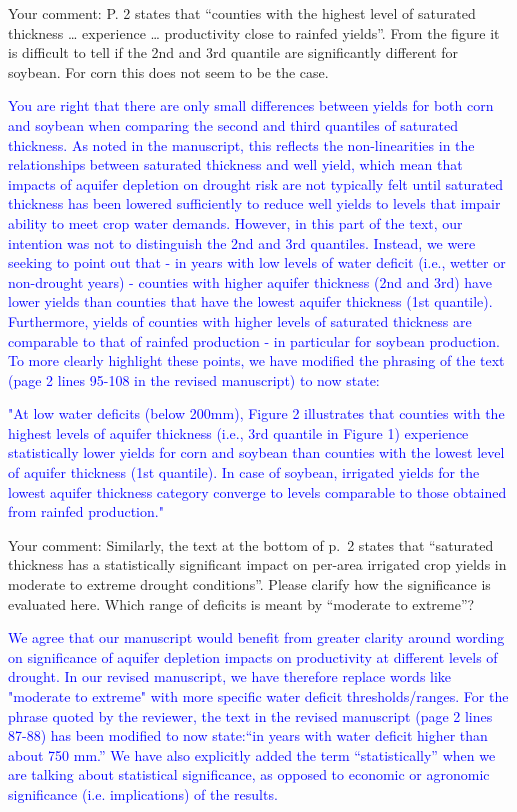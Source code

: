 \documentclass[
]{article}
\begin{document}
Your comment: P. 2 states that ``counties with the highest level of
saturated thickness \ldots{} experience \ldots{} productivity close to
rainfed yields''. From the figure it is difficult to tell if the 2nd and
3rd quantile are significantly different for soybean. For corn this does
not seem to be the case.

\textcolor{blue}{
You are right that there are only small differences between yields for both corn and soybean when comparing the second and third quantiles of saturated thickness. As noted in the manuscript, this reflects the non-linearities in the relationships between saturated thickness and well yield, which mean that impacts of aquifer depletion on drought risk are not typically felt until saturated thickness has been lowered sufficiently to reduce well yields to levels that impair ability to meet crop water demands. However, in this part of the text, our intention was not to distinguish the 2nd and 3rd quantiles. Instead, we were seeking to point out that - in years with low levels of water deficit (i.e., wetter or non-drought years) - counties with higher aquifer thickness (2nd and 3rd) have lower yields than counties that have the lowest aquifer thickness (1st quantile). Furthermore, yields of counties with higher levels of saturated thickness are comparable to that of rainfed production - in particular for soybean production. To more clearly highlight these points, we have modified the phrasing of the text (page 2 lines 95-108 in the revised manuscript) to now state:}

\textcolor{blue}{"At low water deficits (below 200mm), Figure 2 illustrates that counties with the highest levels of aquifer thickness (i.e., 3rd quantile in Figure 1) experience statistically lower yields for corn and soybean than counties with the lowest level of aquifer thickness (1st quantile). In case of soybean, irrigated yields for the lowest aquifer thickness category converge to levels comparable to those obtained from rainfed production."}

Your comment: Similarly, the text at the bottom of p.~2 states that
``saturated thickness has a statistically significant impact on per-area
irrigated crop yields in moderate to extreme drought conditions''.
Please clarify how the significance is evaluated here. Which range of
deficits is meant by ``moderate to extreme''?

\textcolor{blue}{We agree that our manuscript would benefit from greater clarity around wording on significance of aquifer depletion impacts on productivity at different levels of drought. In our revised manuscript, we have therefore replace words like "moderate to extreme" with more specific water deficit thresholds/ranges. For the phrase quoted by the reviewer, the text in the revised manuscript (page 2 lines 87-88) has been modified to now state:``in years with water deficit higher than about 750 mm.'' We have also explicitly added the term ``statistically'' when we are talking about statistical significance, as opposed to economic or agronomic significance (i.e. implications) of the results.
}
\end{document}
